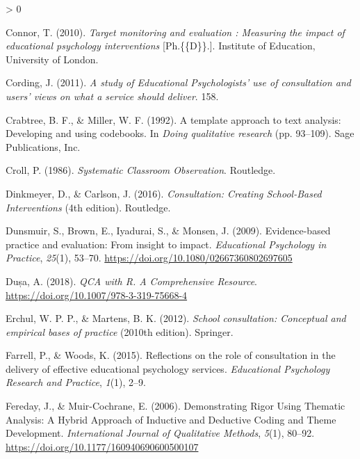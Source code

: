 \documentclass[
  english,
  man,floatsintext]{apa6}
\newlength{\cslhangindent}
\newenvironment{CSLReferences}[2] %
 {%
  \setlength{\parindent}{0pt}
  \ifodd #1 \everypar{\setlength{\hangindent}{\cslhangindent}}\ignorespaces\fi
  \ifnum #2 > 0
  \setlength{\parskip}{#2\baselineskip}
  \fi
 }%
 {}
\begin{document}
\begin{CSLReferences}{1}{0}
\leavevmode\hypertarget{ref-connorTargetMonitoringEvaluation2010}{}%
Connor, T. (2010). \emph{Target monitoring and evaluation : Measuring the impact of educational psychology interventions} {[}Ph.\{\{D\}\}.{]}. Institute of Education, University of London.

\leavevmode\hypertarget{ref-cordingStudyEducationalPsychologists2011}{}%
Cording, J. (2011). \emph{A study of {Educational Psychologists}' use of consultation and users' views on what a service should deliver}. 158.

\leavevmode\hypertarget{ref-crabtreeTemplateApproachText1992}{}%
Crabtree, B. F., \& Miller, W. F. (1992). A template approach to text analysis: {Developing} and using codebooks. In \emph{Doing qualitative research} (pp. 93--109). {Sage Publications, Inc}.

\leavevmode\hypertarget{ref-crollSystematicClassroomObservation1986}{}%
Croll, P. (1986). \emph{Systematic {Classroom Observation}}. {Routledge}.

\leavevmode\hypertarget{ref-dinkmeyerConsultationCreatingSchoolBased2016}{}%
Dinkmeyer, D., \& Carlson, J. (2016). \emph{Consultation: {Creating School}-{Based Interventions}} (4th edition). {Routledge}.

\leavevmode\hypertarget{ref-dunsmuirEvidenceBasedPractice2009}{}%
Dunsmuir, S., Brown, E., Iyadurai, S., \& Monsen, J. (2009). Evidence-based practice and evaluation: From insight to impact. \emph{Educational Psychology in Practice}, \emph{25}(1), 53--70. \url{https://doi.org/10.1080/02667360802697605}

\leavevmode\hypertarget{ref-dusaQCAComprehensiveResource2018}{}%
Dușa, A. (2018). \emph{{QCA} with {R}. {A Comprehensive Resource}}. \url{https://doi.org/10.1007/978-3-319-75668-4}

\leavevmode\hypertarget{ref-erchulSchoolConsultationConceptual2012}{}%
Erchul, W. P. P., \& Martens, B. K. (2012). \emph{School consultation: Conceptual and empirical bases of practice} (2010th edition). Springer.

\leavevmode\hypertarget{ref-farrellReflectionsRoleConsultation2015}{}%
Farrell, P., \& Woods, K. (2015). Reflections on the role of consultation in the delivery of effective educational psychology services. \emph{Educational Psychology Research and Practice}, \emph{1}(1), 2--9.

\leavevmode\hypertarget{ref-feredayDemonstratingRigorUsing2006}{}%
Fereday, J., \& Muir-Cochrane, E. (2006). Demonstrating {Rigor Using Thematic Analysis}: {A Hybrid Approach} of {Inductive} and {Deductive Coding} and {Theme Development}. \emph{International Journal of Qualitative Methods}, \emph{5}(1), 80--92. \url{https://doi.org/10.1177/160940690600500107}


\end{CSLReferences}
\end{document}
